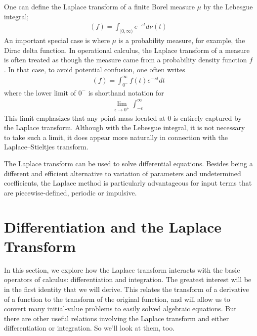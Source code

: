 \documentclass[11pt]{report}
\newcommand{\NI}{\noindent}
\begin{document}
	\NI One can define the Laplace transform of a finite Borel measure $\mu$ by the Lebesgue integral;
	\begin{eqnarray}
		(f) = \int_{[0,\infty)} e^{-st} d\nu(t)
	\end{eqnarray}
	An important special case is where $\mu$ is a probability measure, for example, the Dirac delta function. In operational calculus, the Laplace transform of a measure is often treated as though the measure came from a probability density function $f$. In that case, to avoid potential confusion, one often writes
	\begin{eqnarray}
		(f) =\int_{0^-}^{\infty} f(t)e^{-st}dt
	\end{eqnarray}
	where the lower limit of $0^-$ is shorthand notation for
	\begin{eqnarray}
		\lim_{\epsilon \to 0^+}\int_{-\epsilon}^{\infty}
	\end{eqnarray}
	This limit emphasizes that any point mass located at 0 is entirely captured by the Laplace transform. Although with the Lebesgue integral, it is not necessary to take such a limit, it does appear more naturally in connection with the Laplace–Stieltjes transform.

	\NI The Laplace transform can be used to solve differential equations. Besides being a different and efficient alternative to variation of parameters and undetermined coefficients, the Laplace method is particularly advantageous for input terms that are piecewise-defined, periodic or impulsive.

	\section{Differentiation and the Laplace Transform}
	In this section, we explore how the Laplace transform interacts with the basic operators of calculus: differentiation and integration. The greatest interest will be in the first identity that we will derive. This relates the transform of a derivative of a function to the transform of the original function, and will allow us to convert many initial-value problems to easily solved algebraic equations. But there are other useful relations involving the Laplace transform and either differentiation or integration. So we’ll look at them, too.
	
\end{document}
